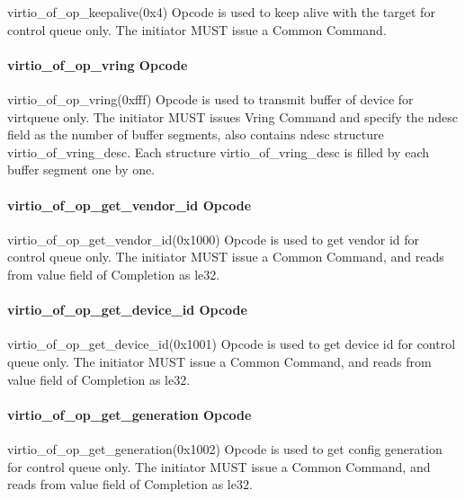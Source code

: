 virtio_of_op_keepalive(0x4) Opcode is used to keep alive with the target for control queue only. The initiator MUST issue a Common Command.

\paragraph{virtio_of_op_vring Opcode}\label{sec:Virtio Transport Options / Virtio Over Fabrics / Transmition Protocol / Opcodes Definition / virtio_of_op_vring Opcode}

virtio_of_op_vring(0xfff) Opcode is used to transmit buffer of device for virtqueue only. The initiator MUST issues Vring Command and specify the ndesc field as the number of buffer segments, also contains ndesc structure virtio_of_vring_desc. Each structure virtio_of_vring_desc is filled by each buffer segment one by one.

\paragraph{virtio_of_op_get_vendor_id Opcode}\label{sec:Virtio Transport Options / Virtio Over Fabrics / Transmition Protocol / Opcodes Definition / virtio_of_op_get_vendor_id Opcode}

virtio_of_op_get_vendor_id(0x1000) Opcode is used to get vendor id for control queue only. The initiator MUST issue a Common Command, and reads from value field of Completion as le32.

\paragraph{virtio_of_op_get_device_id Opcode}\label{sec:Virtio Transport Options / Virtio Over Fabrics / Transmition Protocol / Opcodes Definition / virtio_of_op_get_device_id Opcode}

virtio_of_op_get_device_id(0x1001) Opcode is used to get device id for control queue only. The initiator MUST issue a Common Command, and reads from value field of Completion as le32.

\paragraph{virtio_of_op_get_generation Opcode}\label{sec:Virtio Transport Options / Virtio Over Fabrics / Transmition Protocol / Opcodes Definition / virtio_of_op_get_generation Opcode}

virtio_of_op_get_generation(0x1002) Opcode is used to get config generation for control queue only. The initiator MUST issue a Common Command, and reads from value field of Completion as le32.

